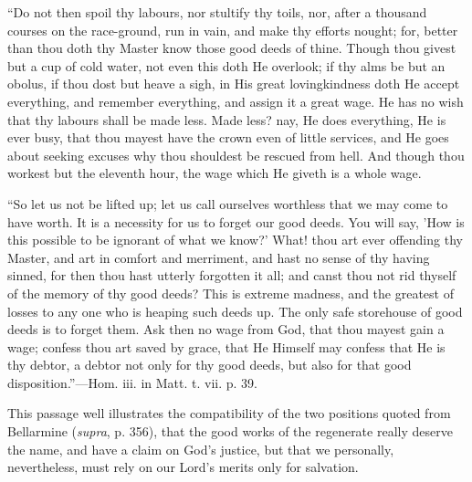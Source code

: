 ``Do not then spoil thy labours, nor stultify thy toils, nor,
after a thousand courses on the race-ground, run in vain, and make thy
efforts nought; for, better than thou doth thy Master know those good
deeds of thine. Though thou givest but a cup of cold water, not even
this doth He overlook; if thy alms be but an obolus, if thou dost but
heave a sigh, in His great lovingkindness doth He accept everything,
and remember everything, and assign it a great wage. He has no wish
that thy labours shall be made less. Made less? nay, He does
everything, He is ever busy, that thou mayest have the crown even of
little services, and He goes about seeking excuses why thou shouldest
be rescued from hell. And though thou workest but the eleventh hour,
the wage which He giveth is a whole wage.

``So let us not be lifted up; let us call ourselves worthless that we may come to have worth. It is a necessity for us to
forget our good deeds. You will say, 'How is this possible to be
ignorant of what we know?' What! thou art ever offending thy Master,
and art in comfort and merriment, and hast no sense of thy having
sinned, for then thou hast utterly forgotten it all; and canst thou
not rid thyself of the memory of thy good deeds? This is extreme
madness, and the greatest of losses to any one who is heaping such
deeds up. The only safe storehouse of good deeds is to forget them.
Ask then no wage from God, that thou mayest gain a wage; confess thou
art saved by grace, that He Himself may confess that He is thy debtor,
a debtor not only for thy good deeds, but also for that good
disposition.''—Hom. iii. in Matt. t. vii. p. 39.

This passage well illustrates the compatibility of the two
positions quoted from Bellarmine (\emph{supra}, p. 356), that the good
works of the regenerate really deserve the name, and have a claim on
God's justice, but that we personally, nevertheless, must rely on our
Lord's merits only for salvation.

